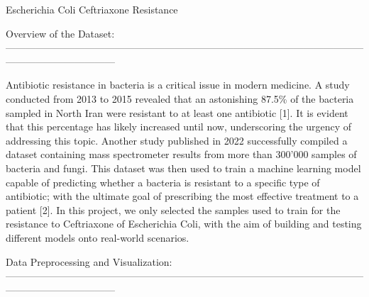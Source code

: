 \documentclass[100pt]{article}
\begin{document}
\setlength{\headsep}{35pt}
\fancyhf{}

\renewcommand\headrulewidth{0pt}
\pagestyle{fancy}

\begin{huge}
\begin{center}
Escherichia Coli Ceftriaxone Resistance
\break
\end{center}
\end{huge}


\begin{normalsize}\color {bluino}
\noindent Overview of the Dataset:\\
---------------------------------------------------------------------------------------------------------------------------------------------
\end{normalsize}

\begin{normalsize}

Antibiotic resistance in bacteria is a critical issue in modern medicine. A study conducted from 2013 to 2015 revealed that an astonishing 87.5\% of the bacteria sampled in North Iran were resistant to at least one antibiotic [1]. It is evident that this percentage has likely increased until now, underscoring the urgency of addressing this topic. Another study published in 2022 successfully compiled a dataset containing mass spectrometer results from more than 300'000 samples of bacteria and fungi. This dataset was then used to train a machine learning model capable of predicting whether a bacteria is resistant to a specific type of antibiotic; with the ultimate goal of prescribing the most effective treatment to a patient [2]. 
\indent In this project, we only selected the samples used to train for the resistance to Ceftriaxone of Escherichia Coli, with the aim of building and testing different models onto real-world scenarios. 

\end{normalsize}

\begin{normalsize}\color {bluino}
\hfill\break

\noindent Data Preprocessing and Visualization:\\
---------------------------------------------------------------------------------------------------------------------------------------------
\end{normalsize}
\end{document}
